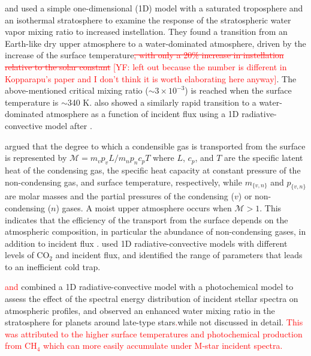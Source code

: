 \documentclass[11pt,numberedappendix,twocolappendix,]{emulateapj}
\def\wv{water vapor}
\def\addYF#1{\textcolor{red}{#1}}
\def\changeYF#1#2{\textcolor{red}{\sout{#1} #2}}
\begin{document}
\citet{Kasting1993} and \citet{Kopparapu2013} used a simple one-dimensional (1D) model with a saturated troposphere and an isothermal stratosphere to examine the response of the stratospheric \wv{} mixing ratio to increased instellation. 
They found a transition from an Earth-like dry upper atmosphere to a water-dominated atmosphere, driven by the increase of the surface temperature\changeYF{, with only a 20\% increase in instellation relative to the solar constant}{[YF: left out because the number is different in Kopparapu's paper and I don't think it is worth elaborating here anyway]}. 
The above-mentioned critical mixing ratio ($\sim 3 \times 10^{-3}$) is reached when the surface temperature is $\sim $340 K. 
\citet{Kodama2015} also showed a similarly rapid transition to a water-dominated atmosphere as a function of incident flux using a 1D radiative-convective model after \citet{Abe1988}. 

\citet{Wordsworth2013,Wordsworth2014} argued that the degree to which a condensible gas is transported from the surface is represented by $\mathcal{M} = m_v p_v L / m_n p_n c_p T $ where $L$, $c_p$, and $T$ are the specific latent heat of the condensing gas, the specific heat capacity at constant pressure of the non-condensing gas, and surface  temperature, respectively, while $m_{\{v,n\}}$ and $p_{\{v,n\}}$ are molar masses and the partial pressures of the  condensing ($v$) or non-condensing ($n$) gases. 
A moist upper atmosphere occurs when $\mathcal{M} > 1$. 
This indicates that the efficiency of the transport from the surface depends on the atmospheric composition, in particular the abundance of non-condensing gases, in addition to incident flux \citep{Wordsworth2014}. 
\citet{Wordsworth2013} used 1D radiative-convective models with different levels of CO$_2$ and incident flux, and identified the range of parameters that leads to an inefficient cold trap. 

\addYF{\citet{Rauer2011} and}{} \citet{Rugheimer2013,Rugheimer2015} combined a 1D radiative-convective model with a photochemical model to assess the effect of the spectral energy distribution of incident stellar spectra on atmospheric profiles, and observed an enhanced water mixing ratio in the stratosphere for planets around late-type stars\addYF{.}{while not discussed in detail.} \addYF{This was attributed to the higher surface temperatures and photochemical production from CH$_4$ which can more easily accumulate under M-star incident spectra. }{}
\end{document}

